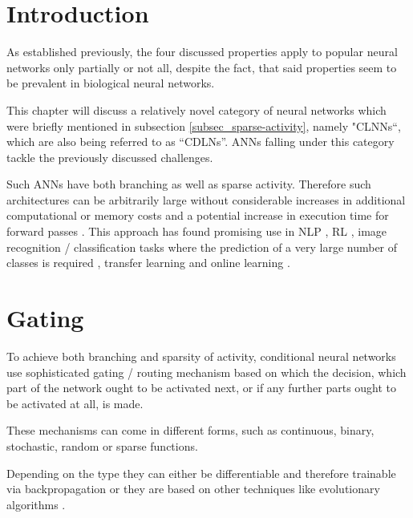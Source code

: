 \section{Introduction}

As established previously, the four discussed properties apply to popular neural networks only partially or not all, despite the fact, that said properties seem to be prevalent in biological neural networks. 

This chapter will discuss a relatively novel category of neural networks which were briefly mentioned in subsection \ref{subsec_sparse-activity}, namely "\acp{CLNN}“, which are also being referred to as “\acp{CDLN}”.
\acp{ANN} falling under this category tackle
the previously discussed challenges.  
 
Such \acp{ANN} have both branching as well as sparse activity. Therefore such architectures can be arbitrarily large without considerable increases in additional computational or memory costs \cite[p. 2]{8_CDL-4-efficient_2015} and a potential increase in execution time
for forward passes \cite{25_conditional-computation-bengio2016}.
This approach has found promising use in \acf{NLP} \cite{14_sparsely-gated-experts_2017}, \acf{RL} \cite{25_conditional-computation-bengio2016}, image recognition / classification tasks where the prediction of a very large number of classes is required
\cite{11_efficient-CDL_2017} \cite{12_dynamic-routing-in-ANNs_2017}
, transfer learning \cite{27_path-net-evolution} and online learning \cite{31_continual-learning-2020}.


\section{Gating}

To achieve both branching and sparsity of activity, conditional neural networks use sophisticated gating / routing mechanism based on which the decision, which part of the network ought to be activated next, or if any further parts ought to be activated at all, is made.

These mechanisms can come in different forms, such as continuous, binary, stochastic, random or sparse functions. 

Depending on the type they can either be differentiable and therefore trainable via backpropagation \cite{24_MoE-eigen2014} \cite{25_conditional-computation-bengio2016} \cite{14_sparsely-gated-experts_2017} or they are based on other techniques like evolutionary algorithms
\cite{27_path-net-evolution}.

